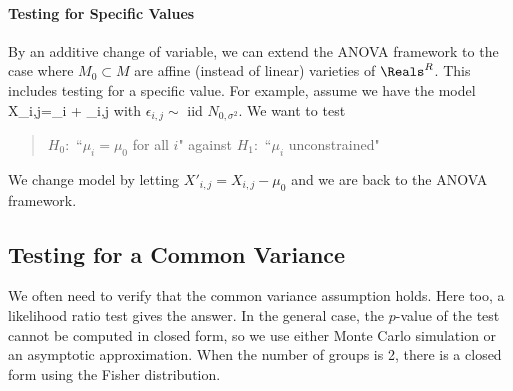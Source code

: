 \paragraph{Testing for Specific Values} By an additive change of
variable, we can extend the ANOVA framework to the case where
$M_0 \subset M$ are affine (instead of linear) varieties of
$\Reals^R$.  This includes testing for a specific value.
 For example, assume we have the model
 \be
 X_{i,j}=\mu_i + \epsilon_{i,j}
 \ee
 with $\epsilon_{i,j}\sim$ iid $N_{0,\sigma^2}$. We want to test
  \begin{quote}
  $H_0$:~``$\mu_i=\mu_0$ for all $i$" against $H_1$:~``$\mu_i$
  unconstrained"
  \end{quote}
We change model by letting $X'_{i,j}=X_{i,j}-\mu_0$ and we are
back to the ANOVA framework.

\subsection{Testing for a Common Variance}
 We often need to verify that the common
variance assumption holds. Here too, a likelihood ratio test
gives the answer. In the general case, the $p$-value of the
test cannot be computed in closed form, so we use either Monte
Carlo simulation or an asymptotic approximation. When the
number of groups is 2, there is a closed form using the Fisher
distribution. %

